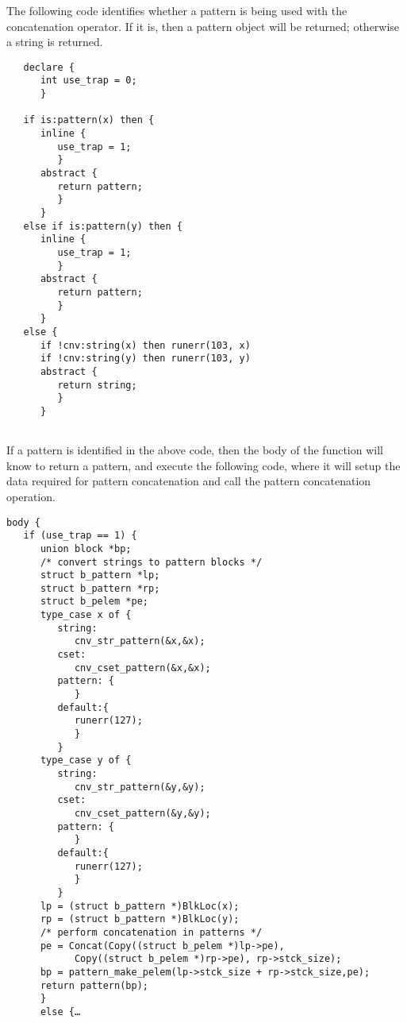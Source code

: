 \documentclass{article}
\begin{document}
The following code identifies whether a pattern is being used with the concatenation operator.  If it is, then a pattern object will be returned; otherwise a string is returned.
\begin{verbatim}
   declare {
      int use_trap = 0;
      }

   if is:pattern(x) then {
      inline {
         use_trap = 1;
         }
      abstract {
         return pattern;
         }
      }
   else if is:pattern(y) then {
      inline {
         use_trap = 1;
         }
      abstract {
         return pattern;
         }
      }
   else {
      if !cnv:string(x) then runerr(103, x)
      if !cnv:string(y) then runerr(103, y)
      abstract {
         return string;
         }
      }
      
\end{verbatim}
If a pattern is identified in the above code, then the body of the function will know to return a pattern, and execute the following code, where it will setup the data required for pattern concatenation and call the pattern concatenation operation.
\begin{verbatim}
body {
   if (use_trap == 1) {
      union block *bp;
      /* convert strings to pattern blocks */
      struct b_pattern *lp;
      struct b_pattern *rp;
      struct b_pelem *pe;
      type_case x of {
         string:
            cnv_str_pattern(&x,&x);
         cset:
            cnv_cset_pattern(&x,&x);
         pattern: {
            }
         default:{
            runerr(127);
            }
         }
      type_case y of {
         string:
            cnv_str_pattern(&y,&y);
         cset:
			cnv_cset_pattern(&y,&y);
         pattern: {
            }
         default:{
            runerr(127);
            }
         }
      lp = (struct b_pattern *)BlkLoc(x);
      rp = (struct b_pattern *)BlkLoc(y);
      /* perform concatenation in patterns */
      pe = Concat(Copy((struct b_pelem *)lp->pe), 
            Copy((struct b_pelem *)rp->pe), rp->stck_size);
      bp = pattern_make_pelem(lp->stck_size + rp->stck_size,pe);
      return pattern(bp);
      }
      else {…
\end{verbatim}
\end{document}
